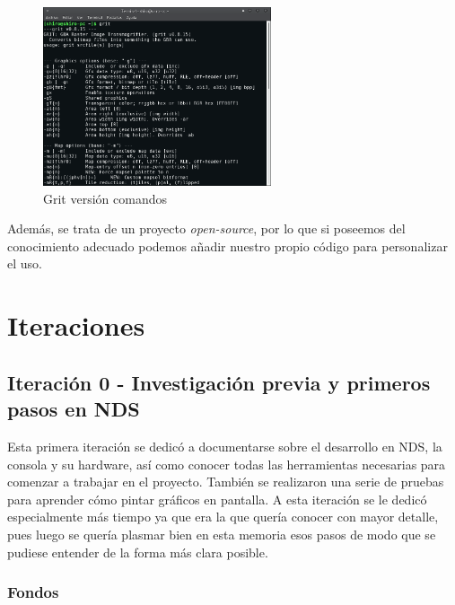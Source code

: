 \clearpage

\begin{figure}[htbp]
\centering
  \includegraphics[width=0.6\textwidth]{archivos/gritcomand.png}
  \caption{Grit versión comandos}
  \label{fig:grit}
\end{figure}

 
 \vspace{0.5cm}

 Además, se trata de un proyecto \textit{open-source}, por lo que si poseemos del conocimiento  adecuado podemos añadir nuestro propio código para personalizar el uso.

 \vspace{1cm}

\section{Iteraciones}

\subsection{Iteración 0 - Investigación previa y primeros pasos en NDS}

Esta primera iteración se dedicó a documentarse sobre el desarrollo en NDS, la consola y su hardware, así como conocer todas las herramientas necesarias para comenzar a trabajar en el proyecto. También se realizaron una serie de pruebas para aprender cómo pintar gráficos en pantalla. A esta iteración se le dedicó especialmente más tiempo ya que era la que quería conocer con mayor detalle, pues luego se quería plasmar bien en esta memoria esos pasos de modo que se pudiese entender de la forma más clara posible.

\subsubsection{Fondos}
\vspace{0.5cm}

